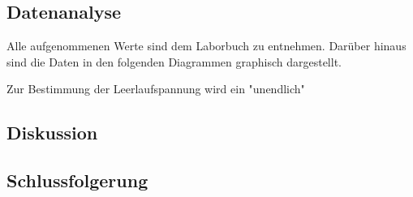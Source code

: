 \subsection{Datenanalyse}

Alle aufgenommenen Werte sind dem Laborbuch zu entnehmen. 
Darüber hinaus sind die Daten in den folgenden Diagrammen graphisch dargestellt.

Zur Bestimmung der Leerlaufspannung wird ein "unendlich"


\subsection{Diskussion}


\subsection{Schlussfolgerung}

